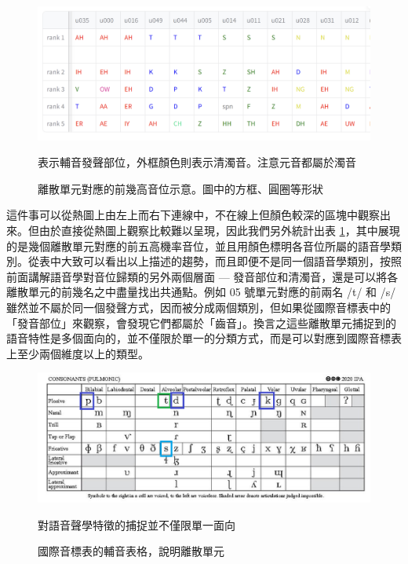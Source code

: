 {        \begin{figure}
            \centering
            \includegraphics[width=1\linewidth]{figures/unit_rank_phn.png}  %
            \caption[]{
離散單元對應的前幾高音位示意。圖中的方框、圓圈等形狀}
                                          表示輔音發聲部位，外框顏色則表示清濁音。注意元音都屬於濁音
            \label{fig:unit-to-phn-rankings}
        \end{figure}
        
        這件事可以從熱圖上由左上而右下連線中，不在線上但顏色較深的區塊中觀察出來。但由於直接從熱圖上觀察比較難以呈現，因此我們另外統計出表 \ref{fig:unit-to-phn-rankings}，其中展現的是幾個離散單元對應的前五高機率音位，並且用顏色標明各音位所屬的語音學類別。從表中大致可以看出以上描述的趨勢，而且即便不是同一個語音學類別，按照前面講解語音學對音位歸類的另外兩個層面 --- 發音部位和清濁音，還是可以將各離散單元的前幾名之中盡量找出共通點。例如 05 號單元對應的前兩名 /t/ 和 /s/ 雖然並不屬於同一個發聲方式，因而被分成兩個類別，但如果從國際音標表中的「發音部位」來觀察，會發現它們都屬於「齒音」。換言之這些離散單元捕捉到的語音特性是多個面向的，並不僅限於單一的分類方式，而是可以對應到國際音標表上至少兩個維度以上的類型。

\begin{figure}
    \centering
    \includegraphics[width=1\linewidth]{figures/ipa_similarity.png}
    \caption[]{
國際音標表的輔音表格，說明離散單元}
                                                                對語音聲學特徵的捕捉並不僅限單一面向
    \label{fig:ipa-cons-table-sim}
\end{figure}

}
